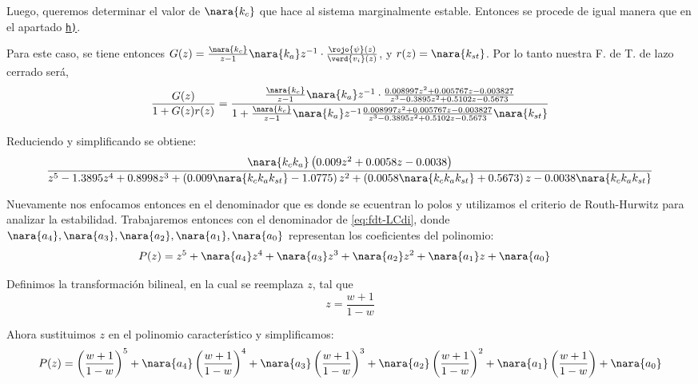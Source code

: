 \FloatBarrier

Luego, queremos determinar el valor de $\nara{k_{c}}$ que hace al sistema
marginalmente estable. Entonces se procede de igual manera que en el apartado
\hyperref[pregunta-h]{\texttt{h)}}.

Para este caso, se tiene entonces
$G(z) = \frac{\nara{k_{c}}}{z-1}\nara{k_{a}} z^{-1} \cdot \frac{\rojo{\psi}(z)}{\verd{v_i}(z)}$,
y $r(z) = \nara{k_{st}}$. Por lo tanto nuestra F. de T. de lazo cerrado será,
\begin{equation}
    \frac{G(z)}{1 + G(z)r(z)} = \dfrac{\frac{\nara{k_{c}}}{z-1}\nara{k_a} z^{-1} \cdot\frac{0.008997z^2 + 0.005767 z - 0.003827}
    {z^3 - 0.3895 z^2 + 0.5102 z -0.5673}}
    {1+\frac{\nara{k_{c}}}{z-1}\nara{k_a} z^{-1} \frac{0.008997z^2 + 0.005767 z - 0.003827}
    {z^3 - 0.3895 z^2 + 0.5102 z -0.5673}\nara{k_{st}}}
\end{equation}

Reduciendo y simplificando se obtiene:
\begin{equation}\label{eq:fdt-LCdi}
    \frac{ \nara{k_c k_a} \left( 0.009 z^2 + 0.0058 z - 0.0038 \right)}
    { z^5 -1.3895z^4 + 0.8998z^3 + \left( 0.009\nara{k_c k_a k_{st}}  -1.0775 \right) z^2 
    + \left(0.0058 \nara{k_c k_a k_{st}}   + 0.5673 \right) z 
    -0.0038 \nara{k_c k_a k_{st}} }
\end{equation}

Nuevamente nos enfocamos entonces en el denominador que es donde se ecuentran lo polos y
utilizamos el criterio de Routh-Hurwitz para analizar la estabilidad. 
Trabajaremos entonces con el denominador de \eqref{eq:fdt-LCdi}, donde $\nara{a_4},\nara{a_3},\nara{a_2},\nara{a_1},\nara{a_0}$
representan los coeficientes del polinomio:
\begin{align}
    P(z) = z^5+ \nara{a_4}z^4 +\nara{a_3}z^3 + \nara{a_2} z^2 + \nara{a_1} z + \nara{a_0} &
\end{align}

Definimos la transformación bilineal, en la cual se reemplaza $z$, tal que 
\begin{equation}
    z = \frac{w+1}{1-w}
\end{equation}

Ahora sustituimos $z$ en el polinomio característico y simplificamos:
\begin{equation}
    P(z) = \left(\frac{w+1}{1-w}\right)^5 +\nara{a_4}\left(\frac{w+1}{1-w}\right)^4 + \nara{a_3}\left(\frac{w+1}{1-w}\right)^3
    + \nara{a_2} \left(\frac{w+1}{1-w}\right)^2 + \nara{a_1} \left(\frac{w+1}{1-w}\right) + \nara{a_0}
\end{equation}


